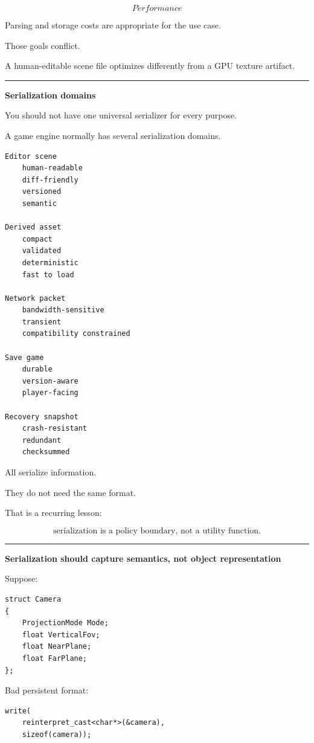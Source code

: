\[
\boxed{
Performance
}
\]

Parsing and storage costs are appropriate for the use case.

Those goals conflict.

A human-editable scene file optimizes differently from a GPU texture artifact.

\begin{center}\rule{0.5\linewidth}{0.5pt}\end{center}

\textbf{Serialization domains}

You should not have one universal serializer for every purpose.

A game engine normally has several serialization domains.

\begin{verbatim}
Editor scene
    human-readable
    diff-friendly
    versioned
    semantic

Derived asset
    compact
    validated
    deterministic
    fast to load

Network packet
    bandwidth-sensitive
    transient
    compatibility constrained

Save game
    durable
    version-aware
    player-facing

Recovery snapshot
    crash-resistant
    redundant
    checksummed
\end{verbatim}

All serialize information.

They do not need the same format.

That is a recurring lesson:

\[
\boxed{
\text{serialization is a policy boundary, not a utility function.}
}
\]

\begin{center}\rule{0.5\linewidth}{0.5pt}\end{center}

\textbf{Serialization should capture semantics, not object representation}

Suppose:

\begin{verbatim}
struct Camera
{
    ProjectionMode Mode;
    float VerticalFov;
    float NearPlane;
    float FarPlane;
};
\end{verbatim}

Bad persistent format:

\begin{verbatim}
write(
    reinterpret_cast<char*>(&camera),
    sizeof(camera));
\end{verbatim}


